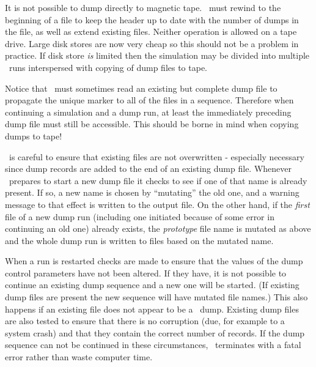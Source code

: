 It is not possible to dump directly to magnetic tape. \moldy\ must
rewind to the beginning of a file to keep the header up to date with
the number of dumps in the file, as well as extend existing files.
Neither operation is allowed on a tape drive.  Large disk stores are
now very cheap so this should not be a problem in practice.  If disk
store {\em is\/} limited then the simulation may be divided into
multiple \moldy\ runs interspersed with copying of dump files to
tape.

Notice that \moldy\  must sometimes read an existing but complete dump
file to propagate the unique marker to all of the files in a sequence.
Therefore when continuing a simulation and a dump run, at least
the immediately preceding dump file must still be accessible.  This
should be borne in mind when copying dumps to tape!

\moldy\  is careful to ensure that existing files are not
overwritten - especially necessary since dump records are added to
the end of an existing dump file.  Whenever \moldy\  prepares to start a
new dump file it checks to see if one of that name is already present.
If so, a new name is chosen by ``mutating'' the old one, and a warning
message to that effect is written to the output file. On the other
hand, if the {\em first\/} file of a new dump run (including one
initiated because of some error in continuing an old one) already
exists, the {\em prototype\/} file name is mutated as above and the
whole dump run is written to files based on the mutated name.

When a run is restarted checks are made to ensure that the values of
the dump control parameters have not been altered.  If they
have, it is not possible to continue an existing dump sequence and a
new one will be started.  (If existing dump files are present the new
sequence will have mutated file names.)  This also happens if an
existing file does not appear to be a \moldy\  dump.  Existing dump
files are also tested to ensure that there is no corruption (due, for
example to a system crash) and that they contain the correct number of
records.  If the dump sequence can not be continued in these
circumstances, \moldy\  terminates with a fatal error rather than waste
computer time.


